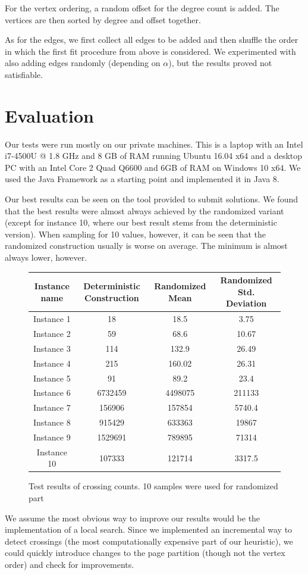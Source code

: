 \documentclass [11pt]{article}
\begin{document}
For the vertex ordering, a random offset for the degree count is added. The vertices are then sorted by degree and offset together. 

As for the edges, we first collect all edges to be added and then shuffle the order in which the first fit procedure from above is considered. We experimented with also adding edges randomly (depending on $\alpha$), but the results proved not satisfiable. 

\section{Evaluation}
Our tests were run mostly on our private machines. This is a laptop with an Intel i7-4500U @ 1.8 GHz and 8 GB of RAM running Ubuntu  16.04 x64  and a desktop PC with an Intel Core 2 Quad Q6600 and 6GB of RAM on Windows 10 x64. We used the Java Framework as a starting point and implemented it in Java 8. 

Our best results can be seen on the tool provided to submit solutions. We found that the best results were almost always achieved by the randomized variant (except for instance 10, where our best result stems from the deterministic version). When sampling for 10 values, however, it can be seen that the randomized construction usually is worse on average. The minimum is almost always lower, however.

\begin{figure}[H]
\centering
  \begin{tabular}{| c | c | c | c |}
\hline
Instance name & Deterministic Construction & Randomized Mean & Randomized Std. Deviation \\
\hline
Instance 1 & 18 & 18.5 & 3.75 \\
\hline 
Instance 2 & 59 & 68.6 & 10.67 \\
\hline 
Instance 3 & 114 & 132.9 & 26.49 \\
\hline 
Instance 4 & 215 & 160.02 & 26.31 \\
\hline 
Instance 5 & 91 & 89.2  & 23.4 \\
\hline 
Instance 6 & 6732459 & 4498075 & 211133\\
\hline 
Instance 7 & 156906 & 157854 & 5740.4 \\
\hline 
Instance 8 & 915429 & 633363 & 19867 \\
\hline 
Instance 9 & 1529691 & 789895 & 71314 \\
\hline 
Instance 10 & 107333 & 121714 & 3317.5 \\
\hline 
\end{tabular}
\caption{Test results of crossing counts.  10 samples were used for randomized part}
\end{figure}




We assume the most obvious way to improve our results would be the implementation of a local search. Since we implemented an incremental way to detect crossings (the most computationally expensive part of our heuristic), we could quickly introduce changes to the page partition (though not the vertex order) and check for improvements. 
\end{document}
